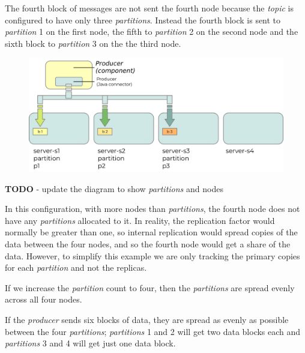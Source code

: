 \documentclass{article}
\newcommand{\kftopic} {\textit{topic}\xspace}
\newcommand{\kfproducer} {\textit{producer}\xspace}
\newcommand{\kfpartition} {\textit{partition}\xspace}
\newcommand{\kfpartitions} {\textit{partitions}\xspace}
\newcommand{\javaname}[1] {{\ttfamily\color{codeblue} #1}}
\begin{document}
The fourth block of messages are not sent the fourth node because the \kftopic is configured to have only three \kfpartitions.
Instead the fourth block is sent to \kfpartition 1 on the first node, the fifth to \kfpartition 2 on the second node and the sixth block to \kfpartition 3 on the the third node.

\begin{figure}[H]
\begin{center}
\includegraphics{images/kafka-partitions-05.png}
%
\label{fig:kafka-partitions-05}
\end{center}
\end{figure}

\textbf{TODO} - update the diagram to show \kfpartitions and nodes

In this configuration, with more nodes than \kfpartitions, the fourth node does not have any \kfpartitions allocated to it.
In reality, the replication factor would normally be greater than one, so internal replication would spread copies of the data between the four nodes, and so the fourth node would get a share of the data.
However, to simplify this example we are only tracking the primary copies for each \kfpartition and not the replicas.

If we increase the \kfpartition count to four, then the \kfpartitions are spread evenly across all four nodes.

If the \kfproducer sends six blocks of data, they are spread as evenly as possible between the four \kfpartitions; \kfpartitions 1 and 2 will get two data blocks each and \kfpartitions 3 and 4 will get just one data block.
\end{document}
